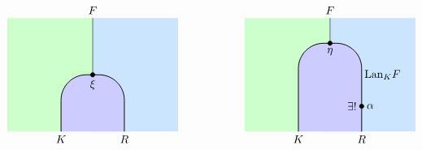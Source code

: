 {\[\begin{tikzpicture}
        \begin{scope}
            \begin{scope} 
                \clip (-2.7,0) rectangle (2.7, 3.6);     
                \fill[fill=leftcolor] (-3,0) rectangle (0, 4);  
                \fill[fill=rightcolor] (0,0) rectangle (3, 4);  
                \draw[fill=midcolor, rounded corners=0.8cm, line width=0.7pt] (-1, -3) rectangle (1, 1.8);
            \end{scope}
            \draw (0, 3.6) -- (0, 1.8);
            \filldraw [black] (0,1.8) circle (2pt) node[below=1pt] {$\xi$};
            \node[below] at (-1, 0) {$K$};
            \node[below] at (1, 0) {$R$};
            \node[above] at (0, 3.6) {$F$};
        \end{scope}
    
        \begin{scope}[shift={(7.5,0)}]
            \begin{scope} 
                \clip (-2.7,0) rectangle (2.7, 3.6);     
                \fill[fill=leftcolor] (-3,0) rectangle (0, 4);  
                \fill[fill=rightcolor] (0,0) rectangle (3, 4);  
                \draw[fill=midcolor, rounded corners=0.8cm, line width=0.7pt] (-1, -2) rectangle (1, 2.8);
            \end{scope}
            \draw (0, 3.6) -- (0,2.8);
            \filldraw [black] (1,0.8) circle (2pt) node[right=1pt] {$\alpha$} node[left=1pt] {$\exists!$};
       
            \node[below] at (-1, 0) {$K$};
            \node[right=-1pt] at (1, 1.8) {$\mathrm{Lan}_KF$};
    
            \node[below] at (1, 0) {$R$};
            \filldraw [black] (0, 2.8) circle (2pt) node[below=1pt] {$\eta$};
        
           
            \node[above] at (0, 3.6) {$F$};
        \end{scope}
    

\end{tikzpicture}\]}
